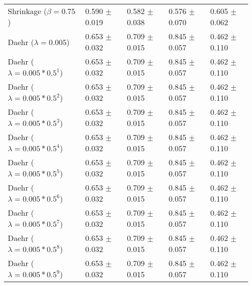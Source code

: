 \begin{table}
\begin{tabular}{*{5}{l}}
Shrinkage ($\beta=0.75$)&0.590 $\pm$ 0.019&0.582 $\pm$ 0.038&0.576 $\pm$ 0.070&0.605 $\pm$ 0.062\\
Daehr ($\lambda=0.005$)&0.653 $\pm$ 0.032&0.709 $\pm$ 0.015&0.845 $\pm$ 0.057&0.462 $\pm$ 0.110\\
Daehr ($\lambda=0.005*0.5^1$)&0.653 $\pm$ 0.032&0.709 $\pm$ 0.015&0.845 $\pm$ 0.057&0.462 $\pm$ 0.110\\
Daehr ($\lambda=0.005*0.5^2$)&0.653 $\pm$ 0.032&0.709 $\pm$ 0.015&0.845 $\pm$ 0.057&0.462 $\pm$ 0.110\\
Daehr ($\lambda=0.005*0.5^3$)&0.653 $\pm$ 0.032&0.709 $\pm$ 0.015&0.845 $\pm$ 0.057&0.462 $\pm$ 0.110\\
Daehr ($\lambda=0.005*0.5^4$)&0.653 $\pm$ 0.032&0.709 $\pm$ 0.015&0.845 $\pm$ 0.057&0.462 $\pm$ 0.110\\
Daehr ($\lambda=0.005*0.5^5$)&0.653 $\pm$ 0.032&0.709 $\pm$ 0.015&0.845 $\pm$ 0.057&0.462 $\pm$ 0.110\\
Daehr ($\lambda=0.005*0.5^6$)&0.653 $\pm$ 0.032&0.709 $\pm$ 0.015&0.845 $\pm$ 0.057&0.462 $\pm$ 0.110\\
Daehr ($\lambda=0.005*0.5^7$)&0.653 $\pm$ 0.032&0.709 $\pm$ 0.015&0.845 $\pm$ 0.057&0.462 $\pm$ 0.110\\
Daehr ($\lambda=0.005*0.5^8$)&0.653 $\pm$ 0.032&0.709 $\pm$ 0.015&0.845 $\pm$ 0.057&0.462 $\pm$ 0.110\\
Daehr ($\lambda=0.005*0.5^9$)&0.653 $\pm$ 0.032&0.709 $\pm$ 0.015&0.845 $\pm$ 0.057&0.462 $\pm$ 0.110\\
\bottomrule
\end{tabular}
\end{table}

